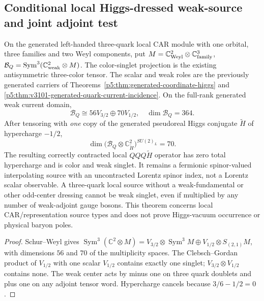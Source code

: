 \documentclass[12pt,a4paper]{article}
\begin{document}
\subsection{Conditional local Higgs-dressed weak-source and joint adjoint test}
\begin{theorem}
\label{p5c:thm:v368-higgs-dressed-quark-source}
On the generated left-handed three-quark local CAR module with one orbital,
three families and two Weyl components, put
\(M=\mathbb C^2_{\rm Weyl}\otimes\mathbb C^3_{\rm family}\),
\(\mathcal B_Q=\operatorname{Sym}^3(\mathbb C^2_{\rm weak}\otimes M)\).
The color-singlet projection is the existing antisymmetric three-color tensor.
The scalar and weak roles are the previously generated carriers of
Theorems~\ref{p5:thm:generated-coordinate-higgs} and
\ref{p5:thm:v3101-generated-quark-current-incidence}.
On the full-rank generated weak current domain,
\[
\mathcal B_Q\cong
56V_{3/2}\oplus70V_{1/2},\quad \dim\mathcal B_Q=364.
\]
After tensoring with \emph{one} copy of the generated pseudoreal Higgs
conjugate \(\widetilde H\) of hypercharge \(-1/2\),
\[
\dim\bigl(\mathcal B_Q\otimes \mathbb C^2_{\widetilde H}\bigr)^{SU(2)_L}=70.
\]
The resulting correctly contracted local \(QQQ\widetilde H\) operator has
zero total hypercharge and is color and weak singlet.  It remains
a fermionic spinor-valued interpolating source with an uncontracted
Lorentz spinor index, not a Lorentz scalar observable. A three-quark local source
without a weak-fundamental or other odd-center dressing cannot be weak singlet,
even if multiplied by any number of weak-adjoint gauge bosons.
This theorem concerns local CAR/representation source types and does not prove
Higgs-vacuum occurrence or physical baryon poles.
\end{theorem}
\begin{proof}
Schur--Weyl gives
\(
\operatorname{Sym}^3(\mathbb C^2\otimes M)=
V_{3/2}\otimes \operatorname{Sym}^3M\oplus
V_{1/2}\otimes S_{(2,1)}M
\), with dimensions \(56\) and \(70\) of the multiplicity spaces.
The Clebsch--Gordan product of \(V_{1/2}\) with one scalar \(V_{1/2}\)
contains exactly one singlet; \(V_{3/2}\otimes V_{1/2}\) contains none.
The weak center acts by minus one on three quark doublets and plus one on
any adjoint tensor word. Hypercharge cancels because \(3/6-1/2=0\).
\end{proof}
\end{document}
